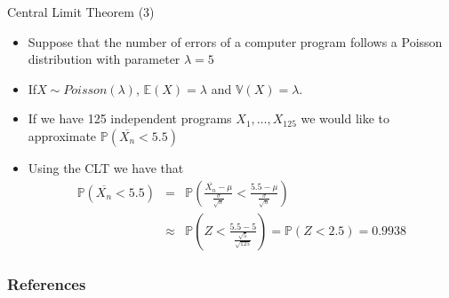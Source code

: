 \documentclass[handout]{beamer}
\begin{document}
\begin{frame}{Central Limit Theorem (3)}
\scriptsize{
\begin{itemize}
 \item Suppose that the number of errors of a computer program follows a Poisson distribution with parameter $\lambda=5$
 \item If$X \sim Poisson(\lambda)$, $\mathbb{E}(X)=\lambda$ and $\mathbb{V}(X)=\lambda$.
 \item If we have 125 independent programs $X_{1},\dots,X_{125}$ we would like to approximate $\mathbb{P}(\overline{X_{n}} < 5.5)$
 \item Using the CLT we have that
 \begin{eqnarray*}
 \mathbb{P}(\overline{X_{n}} < 5.5) & = & \mathbb{P} \left( \frac{\overline{X_{n}}-\mu}{\frac{\sigma}{\sqrt{n}}} <  \frac{5.5 -\mu}{\frac{\sigma}{\sqrt{n}}}  \right) \nonumber \\ 
                                    & \approx & \mathbb{P}\left( Z < \frac{5.5 - 5}{\frac{\sqrt{5}}{\sqrt{125}}}  \right) = \mathbb{P}( Z < 2.5) =0.9938
\end{eqnarray*}

\end{itemize}





}
 
\end{frame}





\begin{frame}[allowframebreaks]\scriptsize
\frametitle{References}


%
\end{frame}  










\end{document}
